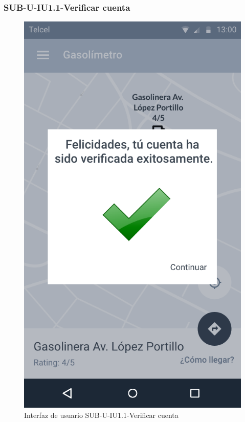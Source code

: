 \subsubsection{SUB-U-IU1.1-Verificar cuenta}\label{SUB-U-IU1.1}
\begin{figure}[H]
	\centering
	\includegraphics[scale=.55]{Capitulo4/software/submodulos/usuarios/images/sub-u-iu1_1}
	\caption{Interfaz de usuario SUB-U-IU1.1-Verificar cuenta}
	\label{fig:sub-u-iu1.1}
\end{figure}